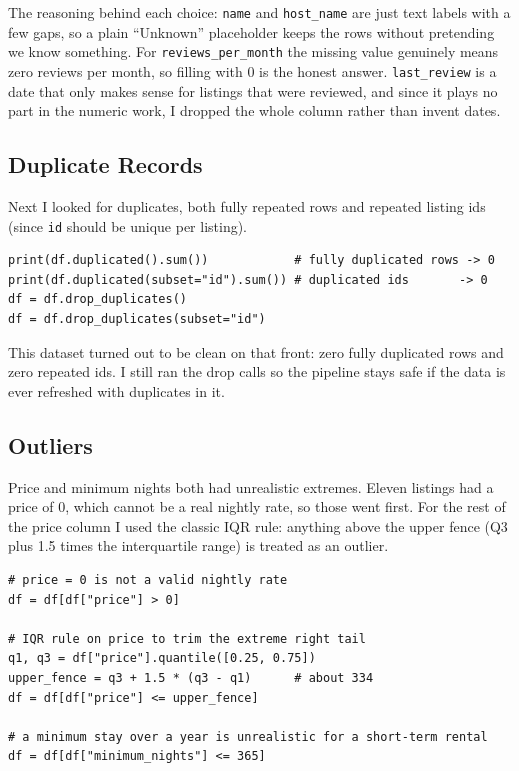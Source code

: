 \documentclass[11pt,a4paper]{article}
\begin{document}
The reasoning behind each choice: \texttt{name} and \texttt{host\_name} are just text labels with a few gaps, so a plain ``Unknown'' placeholder keeps the rows without pretending we know something. For \texttt{reviews\_per\_month} the missing value genuinely means zero reviews per month, so filling with 0 is the honest answer. \texttt{last\_review} is a date that only makes sense for listings that were reviewed, and since it plays no part in the numeric work, I dropped the whole column rather than invent dates.

\subsection*{Duplicate Records}
Next I looked for duplicates, both fully repeated rows and repeated listing ids (since \texttt{id} should be unique per listing).

\begin{lstlisting}[style=py, caption={Checking for duplicates.}]
print(df.duplicated().sum())            # fully duplicated rows -> 0
print(df.duplicated(subset="id").sum()) # duplicated ids       -> 0
df = df.drop_duplicates()
df = df.drop_duplicates(subset="id")
\end{lstlisting}

This dataset turned out to be clean on that front: zero fully duplicated rows and zero repeated ids. I still ran the drop calls so the pipeline stays safe if the data is ever refreshed with duplicates in it.

\subsection*{Outliers}
Price and minimum nights both had unrealistic extremes. Eleven listings had a price of 0, which cannot be a real nightly rate, so those went first. For the rest of the price column I used the classic IQR rule: anything above the upper fence (Q3 plus 1.5 times the interquartile range) is treated as an outlier.

\begin{lstlisting}[style=py, caption={Removing outliers from price and minimum nights.}]
# price = 0 is not a valid nightly rate
df = df[df["price"] > 0]

# IQR rule on price to trim the extreme right tail
q1, q3 = df["price"].quantile([0.25, 0.75])
upper_fence = q3 + 1.5 * (q3 - q1)      # about 334
df = df[df["price"] <= upper_fence]

# a minimum stay over a year is unrealistic for a short-term rental
df = df[df["minimum_nights"] <= 365]
\end{lstlisting}
\end{document}
